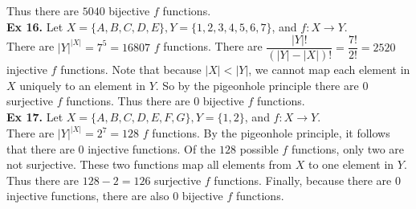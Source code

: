 \documentclass{article}
\begin{document}
\noindent Thus there are $5040$ bijective $f$ functions.\\

\noindent \textbf{Ex 16.} Let $X = \{A,B,C,D,E\}, Y=\{1,2,3,4,5,6,7\}$, and $f: X \rightarrow Y$.\\

\noindent There are $|Y|^{|X|}=7^5=16807$ $f$ functions. There are $\dfrac{|Y|!}{\left(|Y|-|X|\right)!}=\dfrac{7!}{2!}=2520$ injective $f$ functions. Note that because $|X| < |Y|$, we cannot map each element in $X$ uniquely to an element in $Y$. So by the pigeonhole principle there are $0$ surjective $f$ functions. Thus there are $0$ bijective $f$ functions.\\

\noindent \textbf{Ex 17.} Let $X = \{A,B,C,D,E,F,G\}, Y=\{1,2\}$, and $f: X \rightarrow Y$.\\

\noindent There are $|Y|^{|X|}=2^7=128$ $f$ functions. By the pigeonhole principle, it follows that there are $0$ injective functions. Of the $128$ possible $f$ functions, only two are not surjective. These two functions map all elements from $X$ to one element in $Y$. Thus there are $128-2=126$ surjective $f$ functions. Finally, because there are $0$ injective functions, there are also $0$ bijective $f$ functions.\\

\newpage
\end{document}
